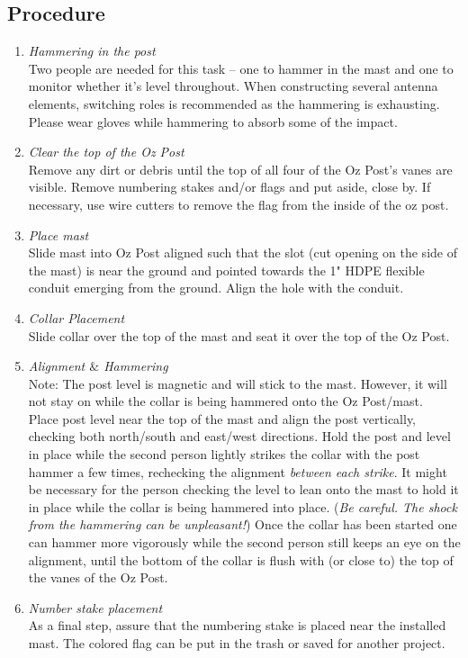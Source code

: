 \documentclass[12pt]{article}
\begin{document}
\begin{enumerate}
	\subsection{Procedure}
		\begin{enumerate}
			\item \emph{Hammering in the post} \\ Two people are needed for this task -- one to hammer in the mast and one to monitor whether it's level throughout. When constructing several antenna elements, switching roles is recommended as the hammering is exhausting. Please wear gloves while hammering to absorb some of the impact.
			\item \emph{Clear the top of the Oz Post} \\ Remove any dirt or debris until the top of all four of the Oz Post's vanes are visible. Remove numbering stakes and/or flags and put aside, close by. If necessary, use wire cutters to remove the flag from the inside of the oz post.
			\item \emph{Place mast} \\ Slide mast into Oz Post aligned such that the slot (cut opening on the side of the mast) is near the ground and pointed towards the 1" HDPE flexible conduit emerging from the ground. Align the hole with the conduit.
			\item \emph{Collar Placement} \\ Slide collar over the top of the mast and seat it over the top of the Oz Post.
			\item \emph{Alignment $\&$ Hammering} \\ Note: The post level is magnetic and will stick to the mast. However, it will not stay on while the collar is being hammered onto the Oz Post/mast. \\ Place post level near the top of the mast and align the post vertically, checking both north/south and east/west directions. Hold the post and level in place while the second person lightly strikes the collar with the post hammer a few times, rechecking the alignment \emph{between each strike}. It might be necessary for the person checking the level to lean onto the mast to hold it in place while the collar is being hammered into place. (\emph{Be careful. The shock from the hammering can be unpleasant!}) Once the collar has been started one can hammer more vigorously while the second person still keeps an eye on the alignment, until the bottom of the collar is flush with (or close to) the top of the vanes of the Oz Post.
			\item \emph{Number stake placement} \\ As a final step, assure that the numbering stake is placed near the installed mast. The colored flag can be put in the trash or saved for another project.
		\end{enumerate}


\end{enumerate}
\end{document}
